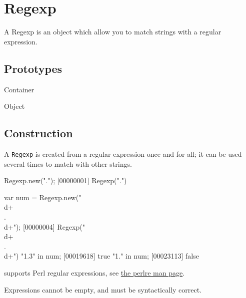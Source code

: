 
\section{Regexp}

A Regexp is an object which allow you to match strings with a regular
expression.

\subsection{Prototypes}
\begin{refObjects}
\item[Container]
\item[Object]
\end{refObjects}

\subsection{Construction}
\label{stdlib:regexp:ctor}

A \lstinline{Regexp} is created from a regular expression once and for all;
it can be used several times to match with other strings.

\begin{urbiscript}
Regexp.new(".");
[00000001] Regexp(".")

var num = Regexp.new("\\d+\\.\\d+");
[00000004] Regexp("\\d+\\.\\d+")
"1.3" in num;
[00019618] true
"1." in num;
[00023113] false
\end{urbiscript}

\us supports Perl regular expressions, see
\href{http://perldoc.perl.org/perlre.html}{the perlre man page}.

Expressions cannot be empty, and must be syntactically correct.




